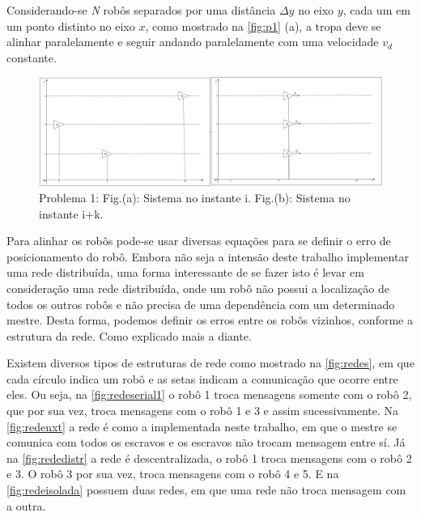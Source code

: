 Considerando-se \emph{N} robôs separados por uma distância $\Delta$$y$ no eixo $y$, cada um em um ponto distinto no eixo $x$, como mostrado na \autoref{fig:p1} (a), a tropa deve se alinhar paralelamente e seguir andando paralelamente com uma velocidade $v_{d}$ constante.

\begin{figure}[!htb]
	\centering
	\includegraphics[width=16cm]{./04-figuras/p1}
	\caption{Problema 1: Fig.(a): Sistema no instante i. Fig.(b): Sistema no instante i+k.}
	\label{fig:p1}
\end{figure}

Para alinhar os robôs pode-se usar diversas equações para se definir o erro de posicionamento do robô. Embora não seja a intensão deste trabalho implementar uma rede distribuída, uma forma interessante de se fazer isto é levar em consideração uma rede distribuída, onde um robô não possui a localização de todos os outros robôs e não precisa de uma dependência com um determinado mestre. Desta forma, podemos definir os erros entre os robôs vizinhos, conforme a estrutura da rede. Como explicado mais a diante.

Existem diversos tipos de estruturas de rede como mostrado na \autoref{fig:redes}, em que cada círculo indica um robô e as setas indicam a comunicação que ocorre entre eles. Ou seja, na \autoref{fig:redeserial1} o robô 1 troca mensagens somente com o robô 2, que por sua vez, troca mensagens com o robô 1 e 3 e assim sucessivamente. Na \autoref{fig:redenxt} a rede é como a implementada neste trabalho, em que o mestre se comunica com todos os escravos e os escravos não trocam mensagem entre sí. Já na \autoref{fig:rededistr} a rede é descentralizada, o robô 1 troca mensagens com o robô 2 e 3. O robô 3 por sua vez, troca mensagens com o robô 4 e 5. E na \autoref{fig:redeisolada} possuem duas redes, em que uma rede não troca mensagem com a outra.


